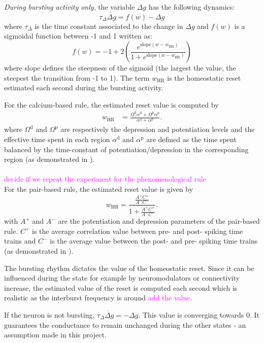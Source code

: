 \textit{During bursting activity only}, the variable $\Delta g$ has the following dynamics: 
$$ \tau_\Delta \dot{\Delta g} = f(w) - \Delta g$$
where $\tau_\Delta$ is the time constant associated to the change in $\Delta g$ and $f(w)$ is a sigmoidal function between -1 and 1 written as:
$$ f(w) = -1+2\left( \frac{e^{\mathrm{slope} (w-w_\mathrm{HR})}}{1+e^{\mathrm{slope} (w-w_\mathrm{HR})}} \right) $$
where slope defines the steepness of the sigmoid (the largest the value, the steepest the transition from -1 to 1). The term $w_\mathrm{HR}$ is the homeostatic reset estimated each second during the bursting activity. 

For the calcium-based rule, the estimated reset value is computed by 
\begin{align}  w_\mathrm{HR} 
    & = \frac{ \Omega^\mathrm{d}\alpha^\mathrm{d} +\Omega^\mathrm{p}\alpha^\mathrm{p} }{\alpha^\mathrm{d} + \alpha^\mathrm{p}}.
\end{align}
where $\Omega^\mathrm{d}$ and $ \Omega^\mathrm{p}$ are respectively the depression and potentiation levels and the effective time spent in each region $\alpha^\mathrm{d}$ and $\alpha^\mathrm{p}$ are defined as the time spent balanced by the time-constant of potentiation/depression in the corresponding region (as demonstrated in \citep{jacquerie_switches_2022}).
~\\
~\\
\textcolor{magenta}{decide if we repeat the experiment for the phenomenological rule}\\
\color{gray}
For the pair-based rule, the estimated reset value is given by 
\[ w_\mathrm{HR} = \frac{\frac{A^+C^+}{A^-C^-}}{1+\frac{A^+C^+}{A^-C^-}}.\]
with $A^+$ and $A^-$ are the potentiation and depression parameters of the pair-based rule. $C^+$ is the average correlation value between pre- and post- spiking time trains and $C^-$ is the average value between the post- and pre- spiking time trains (as demonstrated in \citep{jacquerie_switches_2022}). 
\color{black}


The bursting rhythm dictates the value of the homeostatic reset. Since it can be influenced during the state for example by neuromodulators or connectivity increase, the estimated value of the reset is computed each second which is realistic as the interburst frequency is around \textcolor{magenta}{add the value}.

If the neuron is not bursting, $\tau_\Delta \dot{\Delta g} = -\Delta g$. This value is converging towards 0. It guarantees the conductance to remain unchanged during the other states - an assumption made in this project. 

